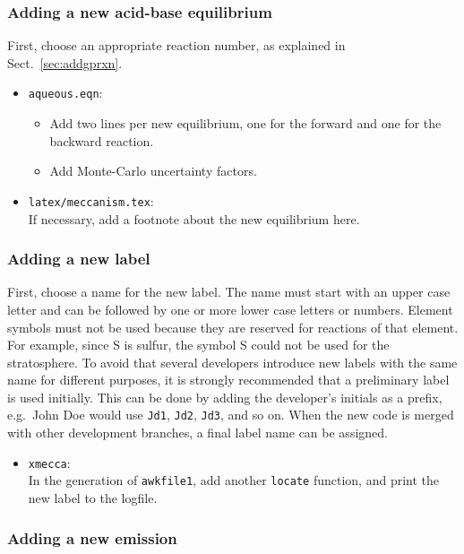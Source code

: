 \documentclass[twoside]{article}
\def\nosep{\setlength\parsep{0mm}\setlength\topsep{0mm}\setlength\itemsep{0mm}}
\begin{document}
\subsubsection{Adding a new acid-base equilibrium}

First, choose an appropriate reaction number, as explained in
Sect.~\ref{sec:addgprxn}.

\begin{itemize}\nosep
\item \verb|aqueous.eqn|:
  \begin{itemize}
  \item Add two lines per new equilibrium, one for the forward and one
    for the backward reaction.
  \item Add Monte-Carlo uncertainty factors.
  \end{itemize}
\item \verb|latex/meccanism.tex|:\\
  If necessary, add a footnote about the new equilibrium here.
\end{itemize}

\subsubsection{Adding a new label}
\label{sec:newlabel}

First, choose a name for the new label. The name must start with an
upper case letter and can be followed by one or more lower case letters
or numbers. Element symbols must not be used because they are reserved
for reactions of that element. For example, since S is sulfur, the
symbol S could not be used for the stratosphere. To avoid that several
developers introduce new labels with the same name for different
purposes, it is strongly recommended that a preliminary label is used
initially. This can be done by adding the developer's initials as a
prefix, e.g.\ John Doe would use \verb|Jd1|, \verb|Jd2|, \verb|Jd3|, and
so on. When the new code is merged with other development branches, a
final label name can be assigned.

\begin{itemize}\nosep
\item \verb|xmecca|:\\
  In the generation of \verb|awkfile1|, add another \verb|locate|
  function, and print the new label to the logfile.
\end{itemize}

\subsubsection{Adding a new emission}
\end{document}
